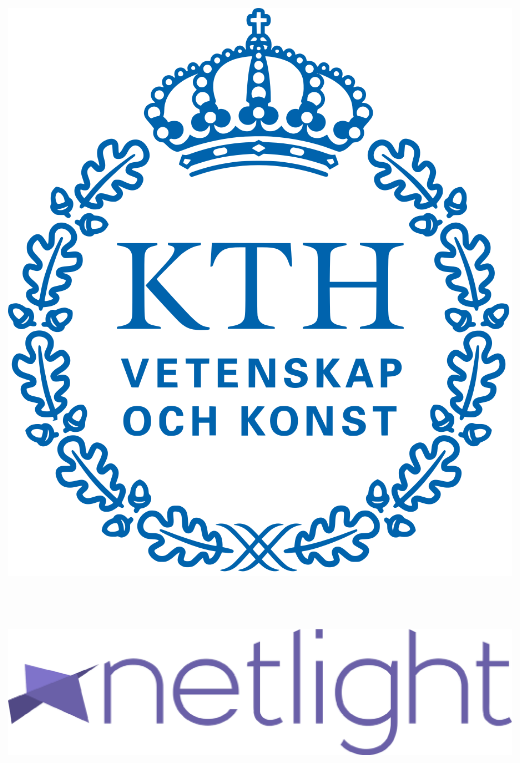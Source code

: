 \documentclass[12pt]{article}
\begin{document}
\begin{titlepage}
\begin{minipage}{0.3\textwidth}
\begin{flushleft}
\includegraphics[scale=0.1]{kth}\\[1cm] 
\end{flushleft}
\end{minipage}
~
\begin{minipage}{0.3\textwidth}
\begin{flushright}
\includegraphics[scale=0.1]{netlight}
\end{flushright}
\end{minipage}

 

\vfill %

\end{titlepage}
\end{document}
